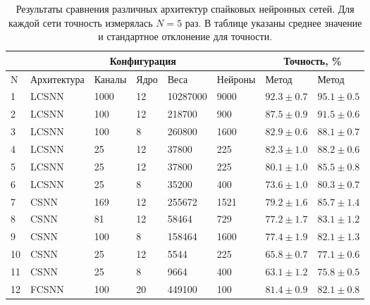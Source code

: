 \documentclass[a4paper]{article}
\begin{document}
\begin{table}[H]
 \caption{Результаты сравнения различных архитектур спайковых нейронных сетей. Для каждой сети точность измерялась $N=5$ раз. В таблице указаны среднее значение и стандартное отклонение для точности.}
\begin{center}
\begin{adjustwidth}{-1cm}{}
\begin{tabular}{|l|l|l|l|l|l|p{2.2cm}|p{2.2cm}|}
\hline
&\multicolumn{5}{c|}{Конфигурация} & \multicolumn{2}{c|}{Точность, \%}\\
\hline
N & Архитектура & Каналы & Ядро & Веса & Нейроны & {Метод \footnotemark[1]} & {Метод \footnotemark[2]} \\
\hline
1 & {LCSNN} & {1000} & {12} & {10287000} & {9000} & {$92.3 \pm 0.7$} & {$95.1 \pm 0.5$}\\
\hline
2 & {LCSNN} & {100} & {12} & {218700} & {900} & {$87.5 \pm 0.9$} & {$91.5 \pm 0.6$}\\
\hline
3 & {LCSNN} & {100} & {8} & {260800} & {1600} & {$82.9 \pm 0.6$} & {$88.1 \pm 0.7$}\\
\hline
4 & {LCSNN\footnotemark[3]} & {25} & {12} & {37800} & {225} & {$82.3 \pm 1.0$} & {$88.2 \pm 0.6$}\\
\hline
5 & {LCSNN} & {25} & {12} & {37800} & {225} & {$80.1 \pm 1.0$} & {$85.5 \pm 0.8$}\\
\hline
6 & {LCSNN} & {25} & {8} & {35200} & {400} & {$73.6 \pm 1.0$} & {$80.3 \pm 0.7$}\\
\hline
7 & {CSNN} & {169} & {12} & {255672} & {1521} & {$79.2 \pm 1.6$} & {$85.7 \pm 1.4$}\\
\hline
8 & {CSNN} & {81} & {12} & {58464} & {729} & {$77.2 \pm 1.7$} & {$83.1 \pm 1.2$}\\
\hline
9 & {CSNN} & {100} & {8} & {158464} & {1600} & {$77.4 \pm 1.9$} & {$82.1 \pm 1.3$}\\
\hline
10 & {CSNN} & {25} & {12} & {5544} & {225} & {$65.8 \pm 0.7$} & {$77.1 \pm 0.6$}\\
\hline
11 & {CSNN} & {25} & {8} & {9664} & {400} & {$63.1 \pm 1.2$} & {$75.8 \pm 0.5$}\\
\hline
12 & {FCSNN} & {100} & {20} & {449100} & {100} & {$81.4 \pm 0.9$} & {$82.1 \pm 0.8$}\\
\hline
\end{tabular}
\end{adjustwidth}
\end{center}
 \label{results}
\end{table}
\end{document}

